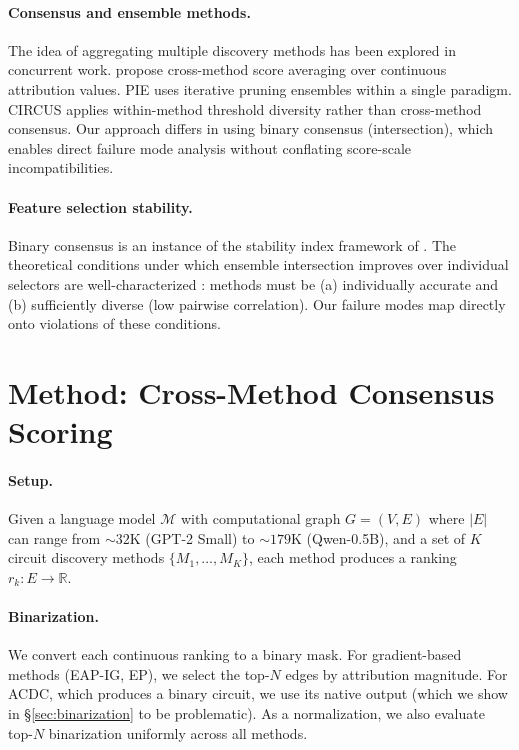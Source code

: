 \documentclass[11pt,a4paper]{article}
\begin{document}
\paragraph{Consensus and ensemble methods.}
The idea of aggregating multiple discovery methods has been explored in concurrent work. \citet{mondorf2025cross} propose cross-method score averaging over continuous attribution values. PIE \cite{chen2026pie} uses iterative pruning ensembles within a single paradigm. CIRCUS \cite{parekh2026circus} applies within-method threshold diversity rather than cross-method consensus. Our approach differs in using binary consensus (intersection), which enables direct failure mode analysis without conflating score-scale incompatibilities.

\paragraph{Feature selection stability.}
Binary consensus is an instance of the stability index framework of \citet{nogueira2016measuring}. The theoretical conditions under which ensemble intersection improves over individual selectors are well-characterized \cite{kuncheva2003measures}: methods must be (a) individually accurate and (b) sufficiently diverse (low pairwise correlation). Our failure modes map directly onto violations of these conditions.

\section{Method: Cross-Method Consensus Scoring}
\label{sec:method}

\paragraph{Setup.}
Given a language model $\mathcal{M}$ with computational graph $G=(V,E)$ where $|E|$ can range from ${\sim}32$K (GPT-2 Small) to ${\sim}179$K (Qwen-0.5B), and a set of $K$ circuit discovery methods $\{M_1, \ldots, M_K\}$, each method produces a ranking $r_k: E \to \mathbb{R}$.

\paragraph{Binarization.}
We convert each continuous ranking to a binary mask. For gradient-based methods (EAP-IG, EP), we select the top-$N$ edges by attribution magnitude. For ACDC, which produces a binary circuit, we use its native output (which we show in \S\ref{sec:binarization} to be problematic). As a normalization, we also evaluate top-$N$ binarization uniformly across all methods.
\end{document}
